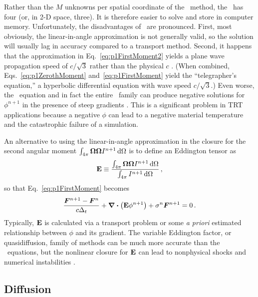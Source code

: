 Rather than the $M$ unknowns per spatial coordinate of the \SN\ method, the
\Pone\ has four (or, in 2-D space, three). It is therefore easier to solve and
store in computer memory. Unfortunately, the disadvantages of \Pone\ are
pronounced.
First, most obviously, the linear-in-angle approximation is not generally valid,
so the solution will
usually lag in accuracy compared to a transport method. Second, it happens that
the approximation in Eq.~\eqref{eq:p1FirstMoment2} yields a plane wave
propagation speed of $c/\sqrt{3}$ rather than the physical $c$
\cite{Mih1984,War2002}. (When combined, Eqs.~\eqref{eq:p1ZerothMoment}
and~\eqref{eq:p1FirstMoment} yield the ``telegrapher's equation,'' a
hyperbolic differential equation with wave speed $c/\sqrt{3}$.)
Even worse, the \Pone\ equation and in fact the entire
\PN\ family can produce negative solutions for $\phi^{n+1}$ in the presence of
steep gradients \cite{Bru2002,McC2007,McC2008a}. This is a significant problem
in TRT
applications because a negative $\phi$ can lead to a negative material
temperature and
the catastrophic failure of a simulation.

An alternative to using the linear-in-angle approximation in the closure for the
second angular moment
$\int_{4\pi} \bm{\Omega}\bm{\Omega} I^{n+1} \mathop{}\!\mathrm{d}\Omega$ is to define an
Eddington tensor \cite{Pom1982,Ols2000} as
\begin{equation*}
  \mathbf{E} \equiv \frac{\int_{4\pi} \bm{\Omega}\bm{\Omega} I^{n+1}
  \mathop{}\!\mathrm{d}\Omega}{\int_{4\pi} I^{n+1} \mathop{}\!\mathrm{d}\Omega}\,,
\end{equation*}
so that Eq.~\eqref{eq:p1FirstMoment} becomes
\begin{equation*}
  \frac{\bm{F}^{n+1} - \bm{F}^n }{c \Delta_t}
  + \bm{\nabla} \bm{\cdot} \left( \mathbf{E}\phi^{n+1} \right)
  + \sigma^n \bm{F}^{n+1}
  = 0\,.
\end{equation*}
Typically, $\mathbf{E}$ is calculated via a transport problem or some \emph{a
priori} estimated relationship between $\phi$ and its gradient.
The variable Eddington factor, or quasidiffusion, family of methods can be much
more accurate than the \Pone\ equations, but the nonlinear closure for $\mathbf{E}$
can lead to nonphysical shocks and numerical instabilities \cite{Ols2000}.

\subsection{Diffusion}\label{sec:bgDiffusion}

